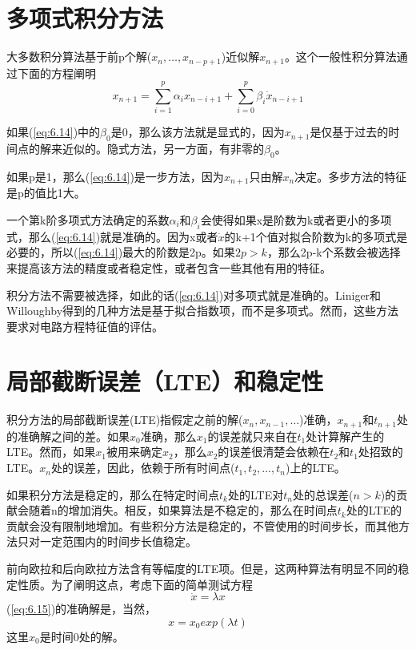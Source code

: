 \section{多项式积分方法}
大多数积分算法基于前p个解($x_n, \dots,x_{n-p+1}$)近似解$x_{n+1}$。这个一般性积分算法通过下面的方程阐明
\begin{equation}
    x_{n+1} = \sum^{p}_{i=1}\alpha_ix_{n-i+1} + \sum^{p}_{i=0}\beta_i\dot{x}_{n-i+1}
    \label{eq:6.14}
\end{equation}

如果(\ref{eq:6.14})中的$\beta_0$是0，那么该方法就是显式的，因为$x_{n+1}$是仅基于过去的时间点的解来近似的。隐式方法，另一方面，有非零的$\beta_0$。

如果p是1，那么(\ref{eq:6.14})是一步方法，因为$x_{n+1}$只由解$x_n$决定。多步方法的特征是p的值比1大。

一个第k阶多项式方法确定的系数$\alpha_i$和$\beta_i$会使得如果x是阶数为k或者更小的多项式，那么(\ref{eq:6.14})就是准确的。因为x或者$\dot{x}$的k+1个值对拟合阶数为k的多项式是必要的，所以(\ref{eq:6.14})最大的阶数是2p。如果$2p > k$，那么2p-k个系数会被选择来提高该方法的精度或者稳定性，或者包含一些其他有用的特征。

积分方法不需要被选择，如此的话(\ref{eq:6.14})对多项式就是准确的。Liniger和Willoughby\cite{ref-68}得到的几种方法是基于拟合指数项，而不是多项式。然而，这些方法要求对电路方程特征值的评估。

\section{局部截断误差（LTE）和稳定性}
积分方法的局部截断误差(LTE)指假定之前的解($x_n,x_{n-1},\dots$)准确，$x_{n+1}$和$t_{n+1}$处的准确解之间的差。如果$x_0$准确，那么$x_1$的误差就只来自在$t_1$处计算解产生的LTE。然而，如果$x_1$被用来确定$x_2$，那么$x_2$的误差很清楚会依赖在$t_2$和$t_1$处招致的LTE。$x_n$处的误差，因此，依赖于所有时间点($t_1,t_2,\dots,t_n$)上的LTE。

如果积分方法是稳定的，那么在特定时间点$t_k$处的LTE对$t_n$处的总误差($n>k$)的贡献会随着n的增加消失。相反，如果算法是不稳定的，那么在时间点$t_k$处的LTE的贡献会没有限制地增加。有些积分方法是稳定的，不管使用的时间步长，而其他方法只对一定范围内的时间步长值稳定。

前向欧拉和后向欧拉方法含有等幅度的LTE项。但是，这两种算法有明显不同的稳定性质。为了阐明这点，考虑下面的简单测试方程
\begin{equation}
    \dot{x} = \lambda x
    \label{eq:6.15}
\end{equation}
(\ref{eq:6.15})的准确解是，当然，
\begin{equation}
    x = x_0 exp(\lambda t)
    \label{eq:6.16}
\end{equation}
这里$x_0$是时间0处的解。

